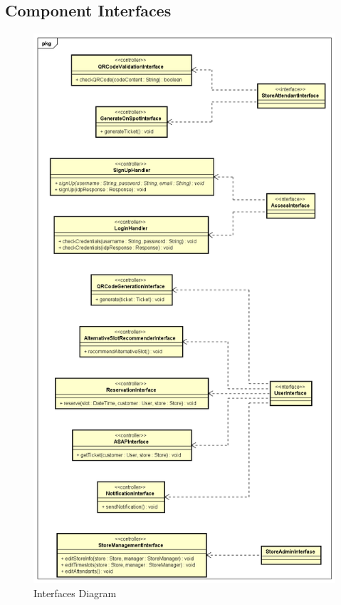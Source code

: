 \documentclass[table, 12pt]{article}
\begin{document}
\subsection{Component Interfaces}
\begin{figure}[H]
    \begin{center}
        \includegraphics[scale=0.35]{assets/Interfaces/Interface-Diagram.png}
        \caption{Interfaces Diagram}\label{interfaces_diagram}
    \end{center}
\end{figure}
\end{document}
